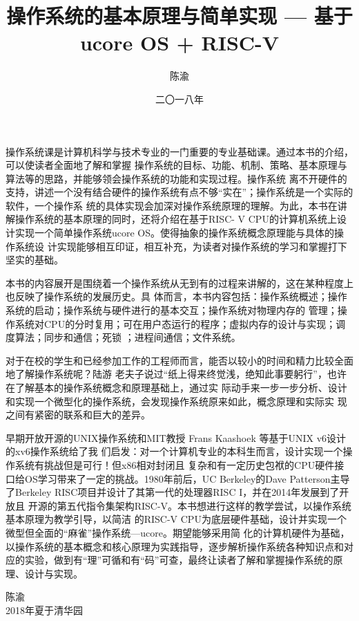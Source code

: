 \documentclass{zhbook}
\title{操作系统的基本原理与简单实现 \newline --- 基于ucore OS + RISC-V}
\author{陈渝}
\date{二〇一八年}
\begin{document}

\maketitle

\frontmatter

	
操作系统课是计算机科学与技术专业的一门重要的专业基础课。通过本书的介绍，可以使读者全面地了解和掌握
操作系统的目标、功能、机制、策略、基本原理与算法等的思路，并能够领会操作系统的功能和实现过程。操作系统
离不开硬件的支持，讲述一个没有结合硬件的操作系统有点不够“实在”；操作系统是一个实际的软件，一个操作系
统的具体实现会加深对操作系统原理的理解。为此，本书在讲解操作系统的基本原理的同时，还将介绍在基于RISC-
V CPU的计算机系统上设计实现一个简单操作系统ucore OS。使得抽象的操作系统概念原理能与具体的操作系统设
计实现能够相互印证，相互补充，为读者对操作系统的学习和掌握打下坚实的基础。

本书的内容展开是围绕着一个操作系统从无到有的过程来讲解的，这在某种程度上也反映了操作系统的发展历史。具
体而言，本书内容包括：操作系统概述；操作系统的启动；操作系统与硬件进行的基本交互；操作系统对物理内存的
管理；操作系统对CPU的分时复用；可在用户态运行的程序；虚拟内存的设计与实现；调度算法；同步和通信；死锁
；进程间通信；文件系统。

%
\begin{preface}

对于在校的学生和已经参加工作的工程师而言，能否以较小的时间和精力比较全面地了解操作系统呢？陆游
老夫子说过“纸上得来终觉浅，绝知此事要躬行”，也许在了解基本的操作系统概念和原理基础上，通过实
际动手来一步一步分析、设计和实现一个微型化的操作系统，会发现操作系统原来如此，概念原理和实际实
现之间有紧密的联系和巨大的差异。

早期开放开源的UNIX操作系统和MIT教授 Frans Kaashoek 等基于UNIX v6设计的xv6操作系统给了我
们启发：对一个计算机专业的本科生而言，设计实现一个操作系统有挑战但是可行！但x86相对封闭且
复杂和有一定历史包袱的CPU硬件接口给OS学习带来了一定的挑战。1980年前后，UC Berkeley的Dave 
Patterson主导了Berkeley RISC项目并设计了其第一代的处理器RISC I，并在2014年发展到了开放且
开源的第五代指令集架构RISC-V。本书想进行这样的教学尝试，以操作系统基本原理为教学引导，以简洁
的RISC-V CPU为底层硬件基础，设计并实现一个微型但全面的“麻雀”操作系统—ucore。期望能够采用简
化的计算机硬件为基础，以操作系统的基本概念和核心原理为实践指导，逐步解析操作系统各种知识点和对
应的实验，做到有“理”可循和有“码”可查，最终让读者了解和掌握操作系统的原理、设计与实现。

\vspace{1cm}
\begin{flushright}
陈渝\\
2018年夏于清华园
\end{flushright}

\end{preface}
\end{document}
